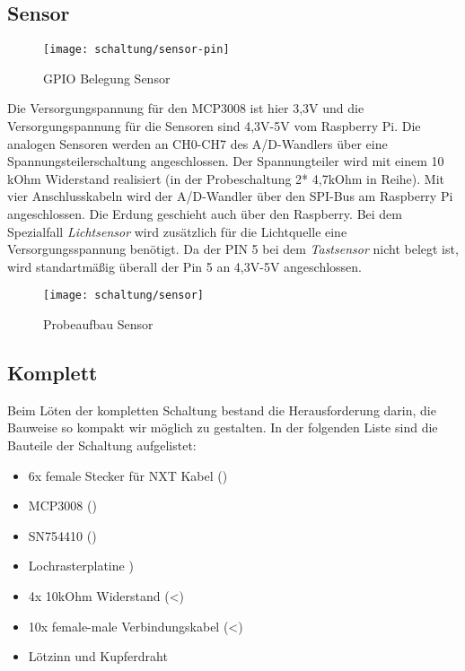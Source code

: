 \subsection{Sensor}
\begin{wrapfigure}{r}{0.65\textwidth}
\texttt{[image: schaltung/sensor-pin]}
\caption{GPIO Belegung Sensor}
\label{ea:sensor-pin}
\end{wrapfigure}

Die Versorgungspannung für den MCP3008 ist hier 3,3V und die Versorgungspannung für die Sensoren sind 4,3V-5V vom Raspberry Pi. Die analogen Sensoren werden an CH0-CH7 des A/D-Wandlers über eine Spannungsteilerschaltung angeschlossen. Der Spannungteiler wird mit einem 10 kOhm Widerstand realisiert (in der Probeschaltung 2* 4,7kOhm in Reihe). Mit vier Anschlusskabeln wird der A/D-Wandler über den SPI-Bus am Raspberry Pi angeschlossen. Die Erdung geschieht auch über den Raspberry. Bei dem Spezialfall \emph{Lichtsensor} wird zusätzlich für die Lichtquelle eine Versorgungsspannung benötigt. Da der PIN 5 bei dem \emph{Tastsensor} nicht belegt ist, wird standartmäßig überall der Pin 5 an 4,3V-5V angeschlossen.

\begin{figure}[h]
  \centering
  \texttt{[image: schaltung/sensor]}
  \caption{Probeaufbau Sensor}
  \label{schaltung:sensor}
\end{figure}

\subsection{Komplett}

Beim Löten der kompletten Schaltung bestand die Herausforderung darin, die Bauweise so kompakt wir möglich zu gestalten. In der folgenden Liste sind die Bauteile der Schaltung aufgelistet:

\begin{itemize}
  \item 6x female Stecker für NXT Kabel ()
  \item MCP3008 ()
  \item SN754410 ()
  \item Lochrasterplatine )
  \item 4x 10kOhm Widerstand (<)
  \item 10x female-male Verbindungskabel (<)
  \item Lötzinn und Kupferdraht
\end{itemize}

